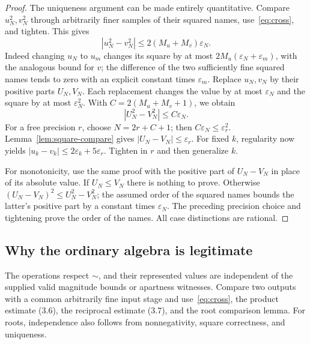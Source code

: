 \documentclass[11pt,a4paper]{article}
\theoremstyle{definition}
\newcommand{\eps}{\varepsilon}
\newcommand{\abs}[1]{\left|#1\right|}
\numberwithin{equation}{section}
\begin{document}
\begin{proof}
The uniqueness argument can be made entirely quantitative. Compare
\(u_N^2,v_N^2\) through arbitrarily finer samples of their squared
names, use~\eqref{eq:cross}, and tighten. This gives
\[
 \abs{u_N^2-v_N^2}\le2(M_u+M_v)\eps_N.
 \tag{3.10}
\]
Indeed changing \(u_N\) to \(u_m\) changes its square by at most
\(2M_u(\eps_N+\eps_m)\), with the analogous bound for \(v\);
the difference of the two sufficiently fine squared names tends to
zero with an explicit constant times \(\eps_m\).
Replace \(u_N,v_N\) by their positive parts \(U_N,V_N\).
Each replacement changes the value by at most \(\eps_N\) and the
square by at most \(\eps_N^2\). With
\(C=2(M_u+M_v+1)\), we obtain
\[
 \abs{U_N^2-V_N^2}\le C\eps_N.
\]
For a free precision \(r\), choose \(N=2r+C+1\); then
\(C\eps_N\le\eps_r^2\). Lemma~\ref{lem:square-compare}
gives \(\abs{U_N-V_N}\le\eps_r\).
For fixed \(k\), regularity now yields
\(\abs{u_k-v_k}\le2\eps_k+5\eps_r\).
Tighten in \(r\) and then generalize \(k\).

For monotonicity, use the same proof with the positive part of
\(U_N-V_N\) in place of its absolute value. If \(U_N\le V_N\)
there is nothing to prove. Otherwise
\((U_N-V_N)^2\le U_N^2-V_N^2\); the assumed order of the squared
names bounds the latter's positive part by a constant times
\(\eps_N\). The preceding precision choice and tightening prove
the order of the names. All case distinctions are rational.
\end{proof}

\subsection{Why the ordinary algebra is legitimate}

The operations respect \(\sim\), and their represented values are
independent of the supplied valid magnitude bounds or apartness
witnesses. Compare two outputs with a common arbitrarily fine input
stage and use~\eqref{eq:cross}, the product estimate (3.6), the
reciprocal estimate (3.7), and the root comparison lemma. For roots,
independence also follows from nonnegativity, square correctness,
and uniqueness.
\end{document}
